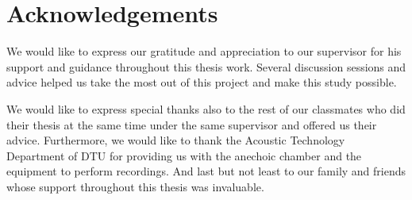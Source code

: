 \chapter*{Acknowledgements} 

We would like to express our gratitude and appreciation to our supervisor for his support and guidance throughout this thesis work.
Several discussion sessions and advice helped us take the most out of this project and make this study possible. 

We would like to express special thanks also to the rest of our classmates who did their thesis at the same time under the same supervisor and offered us their advice. Furthermore, we would like to thank the Acoustic Technology Department of DTU for providing us with the anechoic chamber and the equipment to perform recordings. And last but not least to our family and friends whose support throughout this thesis was invaluable.  